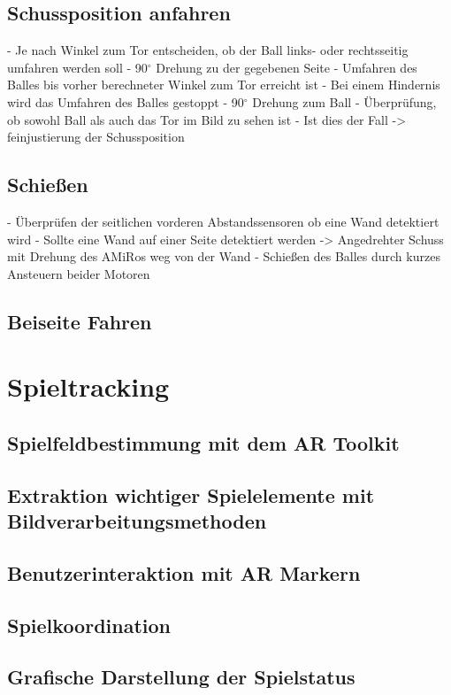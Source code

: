 \subsection{Schussposition anfahren} %
- Je nach Winkel zum Tor entscheiden, ob der Ball links- oder rechtsseitig umfahren werden soll
- 90$^\circ$ Drehung zu der gegebenen Seite 
- Umfahren des Balles bis vorher berechneter Winkel zum Tor erreicht ist
	- Bei einem Hindernis wird das Umfahren des Balles gestoppt
- 90$^\circ$ Drehung zum Ball
- Überprüfung, ob sowohl Ball als auch das Tor im Bild zu sehen ist 
	- Ist dies der Fall -> feinjustierung der Schussposition 

\subsection{Schießen} %
- Überprüfen der seitlichen vorderen Abstandssensoren ob eine Wand detektiert wird
	- Sollte eine Wand auf einer Seite detektiert werden -> Angedrehter Schuss mit Drehung des AMiRos weg von der Wand
- Schießen des Balles durch kurzes Ansteuern beider Motoren 

\subsection{Beiseite Fahren} %

\section{Spieltracking} %

\subsection{Spielfeldbestimmung mit dem AR Toolkit} %

\subsection{Extraktion wichtiger Spielelemente mit Bildverarbeitungsmethoden} %

\subsection{Benutzerinteraktion mit AR Markern} %

\subsection{Spielkoordination} %

\subsection{Grafische Darstellung der Spielstatus} %